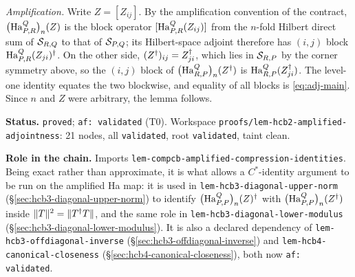 \emph{Amplification.} Write $Z=[Z_{ij}]$. By the amplification convention of the
contract, $\bigl(\mathrm{Ha}^{Q}_{P,R}\bigr)_{n}(Z)$ is the block operator $[\mathrm{Ha}^{Q}_{P,R}(Z_{ij})]$ from the
$n$-fold Hilbert direct sum of $\mathcal S_{R,Q}$ to that of $\mathcal S_{P,Q}$; its Hilbert-space
adjoint therefore has $(i,j)$ block $\mathrm{Ha}^{Q}_{P,R}(Z_{ji})^{\dagger}$. On the other side,
$(Z^{\dagger})_{ij}=Z_{ji}^{\dagger}$, which lies in $\mathcal S_{R,P}$ by the corner symmetry above, so the
$(i,j)$ block of $\bigl(\mathrm{Ha}^{Q}_{R,P}\bigr)_{n}(Z^{\dagger})$ is $\mathrm{Ha}^{Q}_{R,P}(Z_{ji}^{\dagger})$. The level-one
identity equates the two blockwise, and equality of all blocks is \eqref{eq:adj-main}.
Since $n$ and $Z$ were arbitrary, the lemma follows.

\medskip
\noindent\textbf{Status.} \texttt{proved}; \texttt{af: validated} (T0). Workspace
\texttt{proofs/lem-hcb2-amplified-adjointness}: 21 nodes, all \texttt{validated}, root
\texttt{validated}, taint clean.

\noindent\textbf{Role in the chain.} Imports
\texttt{lem-compcb-amplified-compression-identities}. Being exact rather than approximate,
it is what allows a $C^*$-identity argument to be run on the amplified Ha map: it is used
in \texttt{lem-hcb3-diagonal-upper-norm} (\S\ref{sec:hcb3-diagonal-upper-norm}) to
identify $\bigl(\mathrm{Ha}^{Q}_{P,P}\bigr)_{n}(Z)^{\dagger}$ with $\bigl(\mathrm{Ha}^{Q}_{P,P}\bigr)_{n}(Z^{\dagger})$ inside
$\lVert T\rVert^2=\lVert T^{\dagger} T\rVert$, and the same role in
\texttt{lem-hcb3-diagonal-lower-modulus} (\S\ref{sec:hcb3-diagonal-lower-modulus}). It is
also a declared dependency of \texttt{lem-hcb3-offdiagonal-inverse}
(\S\ref{sec:hcb3-offdiagonal-inverse}) and \texttt{lem-hcb4-canonical-closeness}
(\S\ref{sec:hcb4-canonical-closeness}), both now \texttt{af: validated}.
